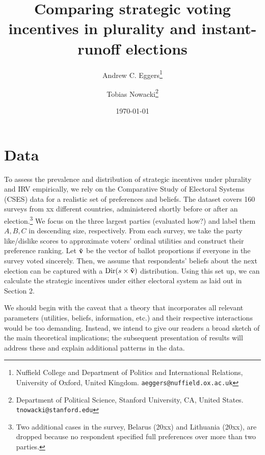 \documentclass[12pt, letter]{article}
\begin{document}
\author{Andrew C. Eggers\thanks{Nuffield College and Department of Politics and International Relations, University of Oxford, United Kingdom. \texttt{aeggers@nuffield.ox.ac.uk}}
\and
Tobias Nowacki\thanks{Department of Political Science, Stanford University, CA, United States. \texttt{tnowacki@stanford.edu}}}
\date{\today}
\title{Comparing strategic voting incentives in plurality and instant-runoff elections}

\maketitle

\onehalfspacing %

\setcounter{section}{3}

\section{Data}


To assess the prevalence and distribution of strategic incentives under plurality and IRV empirically, we rely on the Comparative Study of Electoral Systems (CSES) data for a realistic set of preferences and beliefs. The dataset covers 160 surveys from xx different countries, administered shortly before or after an election.\footnote{Two additional cases in the survey, Belarus (20xx) and Lithuania (20xx), are dropped because no respondent specified full preferences over more than two parties.} We focus on the three largest parties (evaluated how?) and label them $A, B, C$ in descending size, respectively. From each survey, we take the party like/dislike scores to approximate voters' ordinal utilities and construct their preference ranking. Let $\bf \tilde{v}$ be the vector of ballot proportions if everyone in the survey voted sincerely. Then, we assume that respondents' beliefs about the next election can be captured with a $\text{Dir}(s \times \bf \tilde{v})$ distribution. Using this set up, we can calculate the strategic incentives under either electoral system as laid out in Section 2.

We should begin with the caveat that a theory that incorporates all relevant parameters (utilities, beliefs, information, etc.) and their respective interactions would be too demanding. Instead, we intend to give our readers a broad sketch of the main theoretical implications; the subsequent presentation of results will address these and explain additional patterns in the data.
\end{document}
